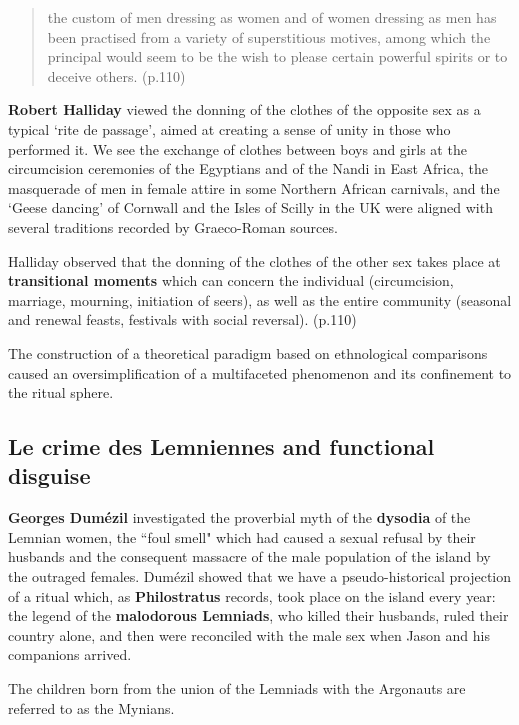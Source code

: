 \begin{quotation}
    the custom of men dressing as women and of women dressing as men has been practised from a variety of superstitious motives, among which the principal would seem to be the wish to please certain powerful spirits or to deceive others. (p.110)
\end{quotation}

\textbf{Robert Halliday} viewed the donning of the clothes of the opposite sex as a typical `rite de passage', aimed at creating a sense of unity in those who performed it. We see the exchange of clothes between boys and girls at the circumcision ceremonies of the Egyptians and of the Nandi in East Africa, the masquerade of men in female attire in some Northern African carnivals, and the `Geese dancing' of Cornwall and the Isles of Scilly in the UK were aligned with several traditions recorded by Graeco-Roman sources.

\begin{rmk}
    Halliday observed that the donning of the clothes of the other sex takes place at \textbf{transitional moments} which can concern the individual (circumcision, marriage, mourning, initiation of seers), as well as the entire community (seasonal and renewal feasts, festivals with social reversal). (p.110)
\end{rmk}

The construction of a theoretical paradigm based on ethnological comparisons caused an oversimplification of a multifaceted phenomenon and its confinement to the ritual sphere.


\subsection{Le crime des Lemniennes and functional disguise}

\textbf{Georges Dum\'{e}zil} investigated the proverbial myth of the \textbf{dysodia} of the Lemnian women, the ``foul smell" which had caused a sexual refusal by their husbands and the consequent massacre of the male population of the island by the outraged females. Dum\'{e}zil showed that we have a pseudo-historical projection of a ritual which, as \textbf{Philostratus} records, took place on the island every year: the legend of the \textbf{malodorous Lemniads}, who killed their husbands, ruled their country alone, and then were reconciled with the male sex when Jason and his companions arrived.

The children born from the union of the Lemniads with the Argonauts are referred to as the Mynians.

